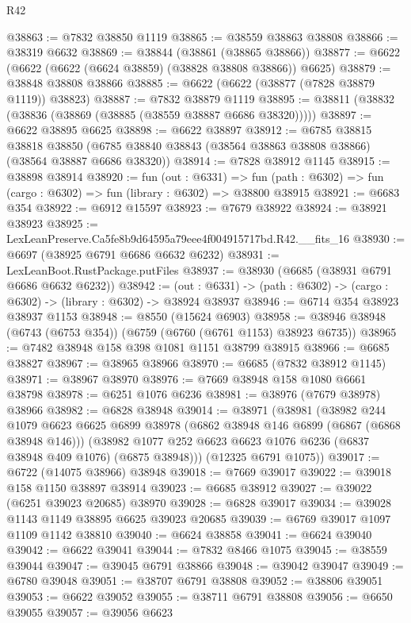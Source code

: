 \begin{lexlean}{R42}
\begin{coremodule}
{@38863 := @7832 @38850 @1119
@38865 := @38559 @38863 @38808
@38866 := @38319 @6632
@38869 := @38844 (@38861 (@38865 @38866))
@38877 := @6622 (@6622 (@6622 (@6624 @38859) (@38828 @38808 @38866)) @6625)
@38879 := @38848 @38808 @38866
@38885 := @6622 (@6622 (@38877 (@7828 @38879 @1119)) @38823)
@38887 := @7832 @38879 @1119
@38895 := @38811 (@38832 (@38836 (@38869 (@38885 (@38559 @38887 @6686 @38320)))))
@38897 := @6622 @38895 @6625
@38898 := @6622 @38897
@38912 := @6785
    @38815
    @38818
    @38850
    (@6785 @38840 @38843 (@38564 @38863 @38808 @38866) (@38564 @38887 @6686 @38320))
@38914 := @7828 @38912 @1145
@38915 := @38898 @38914
@38920 := fun (out : @6331) =>
  fun (path : @6302) => fun (cargo : @6302) => fun (library : @6302) => @38800 @38915
@38921 := @6683 @354
@38922 := @6912 @15597
@38923 := @7679 @38922
@38924 := @38921 @38923
@38925 := LexLeanPreserve.Ca5fe8b9d64595a79eee4f004915717bd.R42.__fits_16
@38930 := @6697 (@38925 @6791 @6686 @6632 @6232)
@38931 := LexLeanBoot.RustPackage.putFiles
@38937 := @38930 (@6685 (@38931 @6791 @6686 @6632 @6232))
@38942 := (out : @6331) -> (path : @6302) -> (cargo : @6302) -> (library : @6302) -> @38924 @38937
@38946 := @6714 @354 @38923 @38937 @1153
@38948 := @8550 (@15624 @6903)
@38958 := @38946 @38948 (@6743 (@6753 @354)) (@6759 (@6760 (@6761 @1153) @38923 @6735))
@38965 := @7482 @38948 @158 @398 @1081 @1151 @38799 @38915
@38966 := @6685 @38827
@38967 := @38965 @38966
@38970 := @6685 (@7832 @38912 @1145)
@38971 := @38967 @38970
@38976 := @7669 @38948 @158 @1080 @6661 @38798
@38978 := @6251 @1076 @6236
@38981 := @38976 (@7679 @38978) @38966
@38982 := @6828 @38948
@39014 := @38971
    (@38981
      (@38982
        @244
        @1079
        @6623
        @6625
        @6899
        @38978
        (@6862 @38948 @146 @6899 (@6867 (@6868 @38948 @146)))
        (@38982 @1077 @252 @6623 @6623 @1076 @6236 (@6837 @38948 @409 @1076) (@6875 @38948)))
      (@12325 @6791 @1075))
@39017 := @6722 (@14075 @38966) @38948
@39018 := @7669 @39017
@39022 := @39018 @158 @1150 @38897 @38914
@39023 := @6685 @38912
@39027 := @39022 (@6251 @39023 @20685) @38970
@39028 := @6828 @39017
@39034 := @39028 @1143 @1149 @38895 @6625 @39023 @20685
@39039 := @6769 @39017 @1097 @1109 @1142 @38810
@39040 := @6624 @38858
@39041 := @6624 @39040
@39042 := @6622 @39041
@39044 := @7832 @8466 @1075
@39045 := @38559 @39044
@39047 := @39045 @6791 @38866
@39048 := @39042 @39047
@39049 := @6780 @39048
@39051 := @38707 @6791 @38808
@39052 := @38806 @39051
@39053 := @6622 @39052
@39055 := @38711 @6791 @38808
@39056 := @6650 @39055
@39057 := @39056 @6623
}
\end{coremodule}
\end{lexlean}
